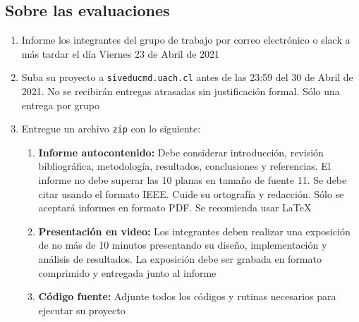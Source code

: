 \documentclass[11pt,letterpaper,spanish,oneside]{article}
\begin{document}
\subsection*{Sobre las evaluaciones}

\begin{enumerate}[noitemsep,topsep=0pt]
    \item Informe los integrantes del grupo de trabajo por correo electrónico o slack a más tardar el día Viernes 23 de Abril de 2021
    \item Suba su proyecto a \texttt{siveducmd.uach.cl} antes de las 23:59 del 30 de Abril de 2021. No se recibirán entregas atrasadas sin justificación formal. Sólo una entrega por grupo
    \item Entregue un archivo \texttt{zip} con lo siguiente:
    \begin{enumerate}
        \item \textbf{Informe autocontenido:} Debe considerar introducción, revisión bibliográfica, metodología, resultados, conclusiones y referencias. El informe no debe superar las 10 planas en tamaño de fuente 11. Se debe citar usando el formato IEEE. Cuide su ortografía y redacción. Sólo se aceptará informes en formato PDF. Se recomienda usar \LaTeX
        \item \textbf{Presentación en video:} Los integrantes deben realizar una exposición de no más de 10 minutos presentando su diseño, implementación y análisis de resultados. La exposición debe ser grabada en formato comprimido y entregada junto al informe
        \item \textbf{Código fuente:} Adjunte todos los códigos y rutinas necesarios para ejecutar su proyecto
    \end{enumerate}

    
    
\end{enumerate}


\nocite{*}



\end{document}
